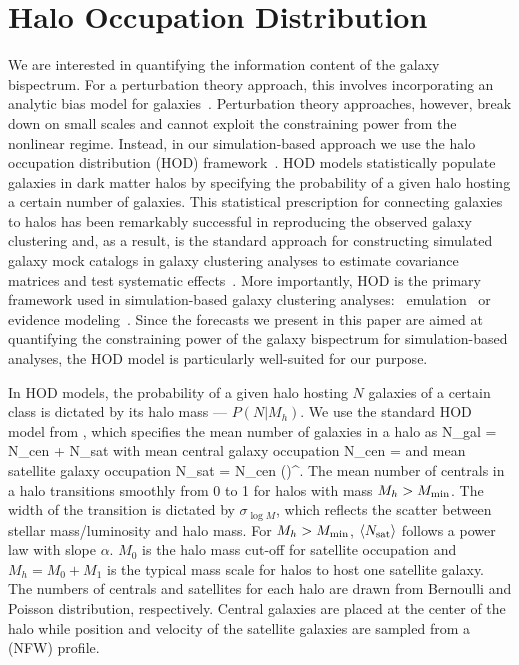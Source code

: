 \section{Halo Occupation Distribution} \label{sec:hod}  
We are interested in quantifying the information content of the galaxy bispectrum. 
For a perturbation theory approach, this involves incorporating an analytic bias model 
for galaxies~\citep[\emph{e.g.}][]{sefusatti2006, yankelevich2019, chudaykin2019}.
Perturbation theory approaches, however, break down on small scales and cannot
exploit the constraining power from the nonlinear regime. Instead, in our simulation-based 
approach we use the halo occupation distribution (HOD) 
framework~\citep[\emph{e.g.}][]{benson2000, peacock2000, seljak2000, berlind2002,
cooray2002, zheng2005, leauthaud2012, tinker2013, zentner2016, vakili2019}.
HOD models statistically populate galaxies in dark matter halos by specifying
the probability of a given halo hosting a certain number of galaxies. This 
statistical prescription for connecting galaxies to halos has been remarkably 
successful in reproducing the observed galaxy clustering and, as a result, is the standard approach for constructing 
simulated galaxy mock catalogs in galaxy clustering analyses to estimate covariance 
matrices and test systematic effects~\citep[\emph{e.g.}][]{rodriguez-torres2016, rodriguez-torres2017, beutler2017}. 
More importantly, HOD is the primary framework used in simulation-based galaxy
clustering analyses: \eg~emulation~\citep{mcclintock2018,
zhai2019} or evidence modeling~\citep{lange2019}. Since the forecasts we
present in this paper are aimed at quantifying the constraining power of the
galaxy bispectrum for simulation-based analyses, the HOD model is particularly 
well-suited for our purpose.

In HOD models, the probability of a given halo hosting $N$ galaxies of a
certain class is dictated by its halo mass --- $P(N|M_h)$. We use the standard
HOD model from \cite{zheng2007}, which specifies the mean number of galaxies in
a halo as
\beq
\langle N_{\rm gal} \rangle = \langle N_{\rm cen} \rangle + \langle N_{\rm sat} \rangle
\eeq
with mean central galaxy occupation
\beq \label{eq:Ncen}
\langle N_{\rm cen} \rangle  = 
\eeq
and mean satellite galaxy occupation
\beq \label{eq:Nsat}
\langle N_{\rm sat} \rangle = \langle N_{\rm cen} \rangle \bigg(\bigg)^\alpha.
\eeq
The mean number of centrals in a halo transitions smoothly from 0 to 1 for halos 
with mass $M_h > M_{\rm min}$. The width of the transition is dictated by 
$\sigma_{\log M}$, which reflects the scatter between stellar mass/luminosity and 
halo mass. For $M_h > M_{\rm min}$, $\langle N_{\rm sat} \rangle$ follows a power 
law with slope $\alpha$. $M_0$ 
is the halo mass cut-off for satellite occupation and $M_h = M_0 + M_1$ is 
the typical mass scale for halos to host one satellite galaxy. The numbers 
of centrals and satellites for each halo are drawn from Bernoulli and Poisson 
distribution, respectively. Central galaxies are placed at the center of the
halo while position and velocity of the satellite galaxies are sampled from a 
\cite{navarro1997} (NFW) profile. 

